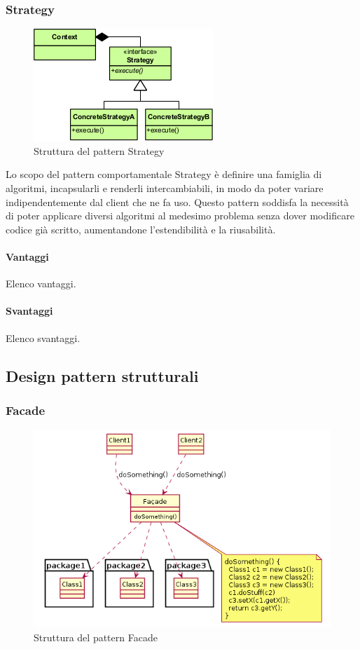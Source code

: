 \documentclass[../SpecificaTecnica.tex]{subfiles}
\begin{document}
\begin{appendices}
		\subsubsection{Strategy}
			\begin{figure}[!h]
				\centering
				\includegraphics[scale=0.7]{pattern/strategy}
				\caption{Struttura del pattern Strategy}
				\label{fig:Struttura_Strategy}
			\end{figure}
			
			Lo scopo del pattern comportamentale Strategy è definire una famiglia di algoritmi, incapsularli e renderli intercambiabili, in modo da poter variare indipendentemente dal client che ne fa uso. Questo pattern soddisfa la necessità di poter applicare diversi algoritmi al medesimo problema senza dover modificare codice già scritto, aumentandone l'estendibilità e la riusabilità.
			\paragraph{Vantaggi}
				Elenco vantaggi.
			\paragraph{Svantaggi}
				Elenco svantaggi.
	\subsection{Design pattern strutturali}
		\subsubsection{Facade}
			\begin{figure}[!h]
				\centering
				\includegraphics[scale=0.5]{pattern/facade}
				\caption{Struttura del pattern Facade}
				\label{fig:Struttura_Facade}
			\end{figure}		
		

\end{appendices}
\end{document}
